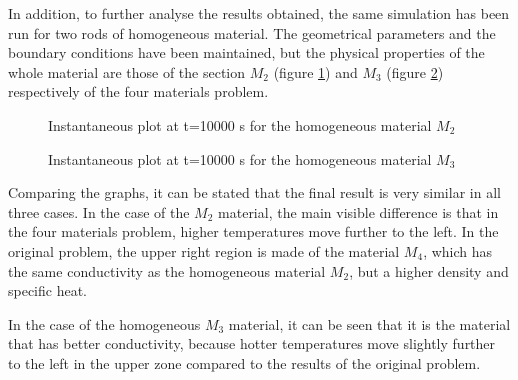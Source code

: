 In addition, to further analyse the results obtained, the same simulation has been run for two rods of homogeneous material. The geometrical parameters and the boundary conditions have been maintained, but the physical properties of the whole material are those of the section $M_{2}$ (figure \ref{HomoM2}) and $M_{3}$ (figure \ref{HomoM3}) respectively of the four materials problem.
\begin{figure}[h]
	\centering
	
	\caption{Instantaneous plot at t=10000 s for the homogeneous material $M_{2}$}
	\label{HomoM2}
\end{figure}
\begin{figure}[h]
	\centering
	
	\caption{Instantaneous plot at t=10000 s for the homogeneous material $M_{3}$}
	\label{HomoM3}
\end{figure}

Comparing the graphs, it can be stated that the final result is very similar in all three cases. In the case of the $M_{2}$ material, the main visible difference is that in the four materials problem, higher temperatures move further to the left. In the original problem, the upper right region is made of the material $M_{4}$, which has the same conductivity as the homogeneous material $M_{2}$, but a higher density and specific heat.

In the case of the homogeneous $M_{3}$ material, it can be seen that it is the material that has better conductivity, because hotter temperatures move slightly further to the left in the upper zone compared to the results of the original problem.